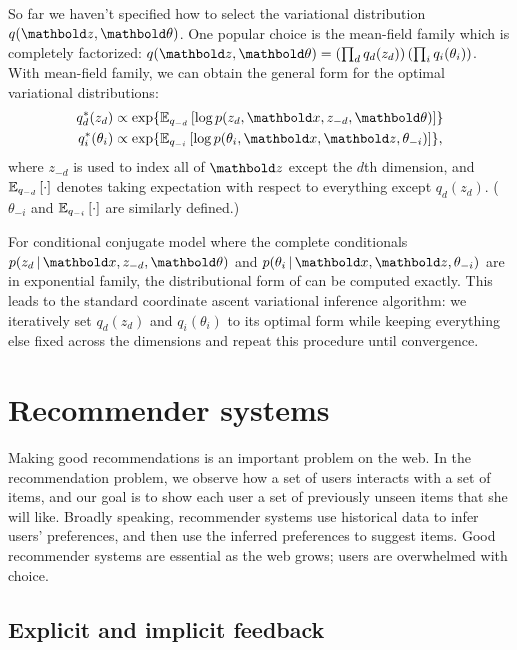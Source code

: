 So far we haven't specified how to select the variational distribution $q(\mbz, \mb\theta)$. One popular choice is the mean-field family which is completely factorized: $q(\mbz, \mb\theta) = \left(\prod_{d} q_d(z_{d})\right) \left(\prod_i q_i(\theta_i) \right)$. With mean-field family, we can obtain the general form for the optimal variational distributions:
\begin{equation}
\begin{split}
q^*_d(z_d) &\propto \exp\{\EE{q_{-d}}{\log p(z_d, \mbx, z_{-d}, \mb\theta)}\}
\\
q^*_i(\theta_i) &\propto \exp\{\EE{q_{-i}}{\log p(\theta_i, \mbx, \mbz, \theta_{-i})}\},
\end{split}
\label{chpt:background:eq:opt_q}
\end{equation}
where $z_{-d}$ is used to index all of $\mbz$ except the $d$th dimension, and $\mathbb{E}_{q_{-d}}\left[\cdot\right]$ denotes taking expectation with respect to everything except $q_d(z_d)$. ($\theta_{-i}$ and $\mathbb{E}_{q_{-i}}\left[\cdot\right]$ are similarly defined.)

For conditional conjugate model where the complete conditionals $p(z_d \g \mbx, z_{-d}, \mb\theta)$ and $p(\theta_i \g \mbx, \mbz, \theta_{-i})$ are in exponential family, the distributional form of  can be computed exactly. This leads to the standard coordinate ascent variational inference algorithm: we iteratively set $q_d(z_d)$ and $q_i(\theta_i)$ to its optimal form while keeping everything else fixed across the dimensions and repeat this procedure until convergence. 

\section{Recommender systems}\label{chpt:background:sec:recsys}

Making good recommendations is an important problem on the web. In the
recommendation problem, we observe how a set of users interacts with a
set of items, and our goal is to show each user a set of previously
unseen items that she will like.  Broadly speaking, recommender
systems use historical data to infer users' preferences, and then use
the inferred preferences to suggest items.  Good recommender
systems are essential as the web grows; users are overwhelmed with
choice.

\subsection{Explicit and implicit feedback} \label{chpt:background:sec:data}

